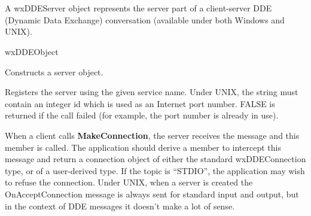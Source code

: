 \section{}\label{wxddeserver}

A wxDDEServer object represents the server part of a client-server DDE
(Dynamic Data Exchange) conversation (available under both Windows
and UNIX).


wxDDEObject






Constructs a server object.



Registers the server using the given service name. Under UNIX, the
string must contain an integer id which is used as an Internet port
number. FALSE is returned if the call failed (for example, the port
number is already in use).

\label{wxddeserveronacceptconnection}


When a client calls {\bf MakeConnection}, the server receives the
message and this member is called. The application should derive a
member to intercept this message and return a connection object of
either the standard wxDDEConnection type, or of a user-derived type. If the
topic is ``STDIO'', the application may wish to refuse the connection.
Under UNIX, when a server is created the OnAcceptConnection message is
always sent for standard input and output, but in the context of DDE
messages it doesn't make a lot of sense.



